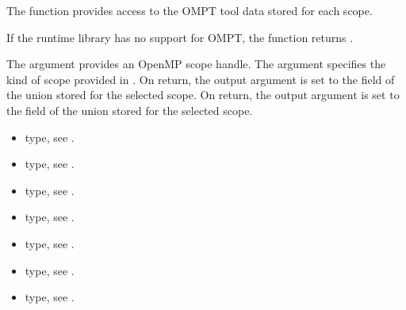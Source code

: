 \descr
The function  provides access to the OMPT tool data
stored for each scope.

If the runtime library has no support for OMPT, the function returns 
.


\argdesc
The argument  provides an OpenMP scope handle.
The argument  specifies the kind of scope provided in .
On return, the output argument  is set to the  field of the 
 union stored for the selected scope.
On return, the output argument  is set to the   field of the 
 union stored for the selected scope.


\crossreferences
\begin{itemize}
    \item {} type, see .
	\item {} type, see 
        .
    \item {} type, see .
    \item {} type, see 
        .
    \item {} type, see .
    \item {} type, see .
    \item {} type, see .
\end{itemize}


